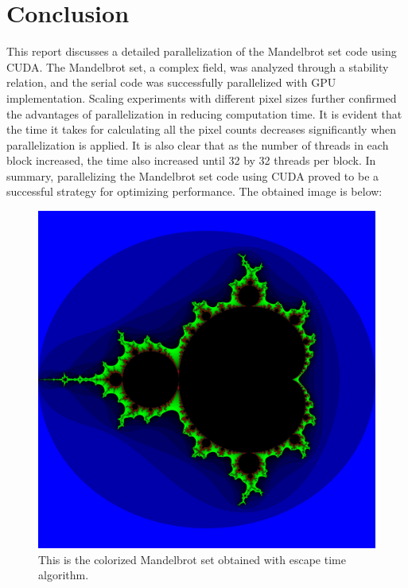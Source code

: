 \documentclass{article}
\begin{document}
\section{Conclusion}
This report discusses a detailed parallelization of the Mandelbrot set code using CUDA. The Mandelbrot set, a complex field, was analyzed through a stability relation, and the serial code was successfully parallelized with GPU implementation. Scaling experiments with different pixel sizes further confirmed the advantages of parallelization in reducing computation time.
It is evident that the time it takes for calculating all the pixel counts decreases significantly when parallelization is applied. It is also clear that as the number of threads in each block increased, the time also increased until 32 by 32 threads per block. In summary, parallelizing the Mandelbrot set code using CUDA proved to be a successful strategy for optimizing performance. The obtained image is below:
\begin{figure}[h!]
\centering
\includegraphics[width=0.60\linewidth]{mandelbrot.jpg}
\caption{\label{fig:Mandelbrot Set}This is the colorized Mandelbrot set obtained with escape time algorithm. }
\end{figure}
\end{document}
